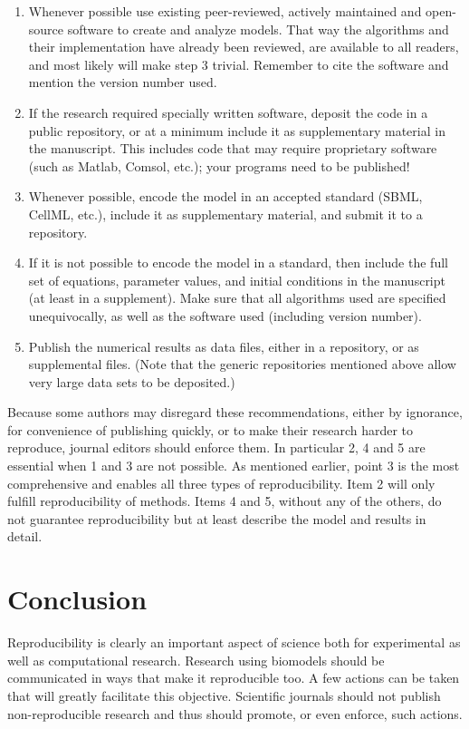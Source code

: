 \begin{enumerate}
\item Whenever possible use existing peer-reviewed, actively maintained and open-source software to create and analyze models. That way the algorithms and their implementation have already been reviewed, are available to all readers, and most likely will make step 3 trivial. Remember to cite the software and mention the version number used.
\item If the research required specially written software, deposit the code in a public repository, or at a minimum include it as supplementary material in the manuscript. This includes code that may require proprietary software (such as Matlab, Comsol, etc.); your programs need to be published!
\item Whenever possible, encode the model in an accepted standard (SBML, CellML, etc.),  include it as supplementary material, and submit it to a repository.
\item If it is not possible to encode the model in a standard, then include the full set of equations, parameter values, and initial conditions in the manuscript (at least in a supplement). Make sure that all algorithms used are specified unequivocally, as well as the software used (including version number). 
\item Publish the numerical results as data files, either in a repository, or as supplemental files. (Note that the generic repositories mentioned above allow very large data sets to be deposited.)
\end{enumerate}

Because some authors may disregard these recommendations, either by ignorance, for convenience of publishing quickly, or to make their research harder to reproduce, journal editors should enforce them. In particular 2, 4 and 5 are essential when 1 and 3 are not possible. As mentioned earlier, point 3 is the most comprehensive and enables all three types of reproducibility. Item 2 will only fulfill reproducibility of methods. Items 4 and 5, without any of the others, do not guarantee reproducibility but at least describe the model and results in detail.

\section{Conclusion}
\label{sec:conclusion}
Reproducibility is clearly an important aspect of science both for experimental as well as computational research. Research using biomodels should be communicated in ways that make it reproducible too. A few actions can be taken that will greatly facilitate this objective. Scientific journals should not publish non-reproducible research and thus should promote, or even enforce, such actions. 


